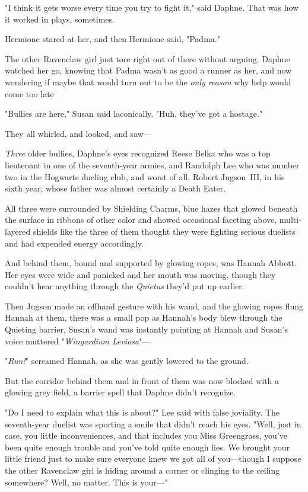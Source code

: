 "I think it gets worse every time you try to fight it," said Daphne. That was
how it worked in plays, sometimes.

Hermione stared at her, and then Hermione said, "Padma."

The other Ravenclaw girl just tore right out of there without arguing. Daphne
watched her go, knowing that Padma wasn't as good a runner as her, and now
wondering if maybe that would turn out to be the \emph{only reason} why help
would come too late{\el}

"Bullies are here," Susan said laconically. "Huh, they've got a hostage."

They all whirled, and looked, and saw\mbox{---}

\emph{Three} older bullies, Daphne's eyes recognized Reese Belka who was a top
lieutenant in one of the seventh-year armies, and Randolph Lee who was number
two in the Hogwarts dueling club, and worst of all, Robert Jugson~III, in his
sixth year, whose father was almost certainly a Death Eater.

All three were surrounded by Shielding Charms, blue hazes that glowed beneath
the surface in ribbons of other color and showed occasional faceting above,
multi-layered shields like the three of them thought they were fighting serious
duelists and had expended energy accordingly.

And behind them, bound and supported by glowing ropes, was Hannah Abbott. Her
eyes were wide and panicked and her mouth was moving, though they couldn't hear
anything through the \emph{Quietus} they'd put up earlier.

Then Jugson made an offhand gesture with his wand, and the glowing ropes flung
Hannah at them, there was a small pop as Hannah's body blew through the
Quieting barrier, Susan's wand was instantly pointing at Hannah and Susan's
voice muttered "\emph{Wingardium Leviosa}"\mbox{---}

"\emph{Run!}" screamed Hannah, as she was gently lowered to the ground.

But the corridor behind them and in front of them was now blocked with a
glowing grey field, a barrier spell that Daphne didn't recognize.

"Do I need to explain what this is about?" Lee said with false joviality. The
seventh-year duelist was sporting a smile that didn't reach his eyes. "Well,
just in case, you little inconveniences, and that includes you Miss Greengrass,
you've been quite enough trouble and you've told quite enough lies. We brought
your little friend just to make sure everyone knew we got all of you---though I
suppose the other Ravenclaw girl is hiding around a corner or clinging to the
ceiling somewhere? Well, no matter. This is your\mbox{---}"

